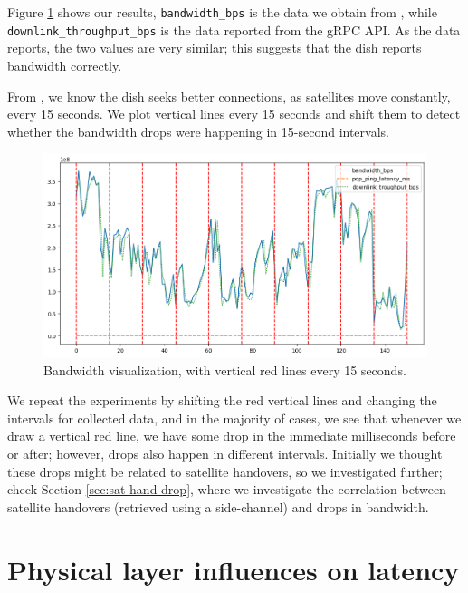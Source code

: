 \documentclass[]{report}
\begin{document}
Figure \ref{fig:vis-bw-15sec} shows our results, \texttt{bandwidth\_bps} is the data we obtain from
, while \texttt{downlink\_throughput\_bps} is the data reported
from the gRPC API. As the data reports, the two values are very similar; this suggests that the dish reports bandwidth
correctly.

From \cite{llc-application}, we know the dish seeks better connections, as satellites move constantly, every 15 seconds.
We plot vertical lines every 15 seconds and shift them to detect whether the bandwidth drops were happening in 15-second
intervals.

\begin{figure}
    \centering
    \includegraphics[width=1.0\columnwidth]{img/bw-15seconds.png}
    \caption{Bandwidth visualization, with vertical red lines every 15 seconds.}
    \label{fig:vis-bw-15sec}
\end{figure}

We repeat the experiments by shifting the red vertical lines and changing the intervals for collected data, and in the
majority of cases, we see that whenever we draw a vertical red line, we have some drop in the immediate milliseconds
before or after; however, drops also happen in different intervals. Initially we thought these drops might be related to
satellite handovers, so we investigated further; check Section \ref{sec:sat-hand-drop}, where we investigate the
correlation between satellite handovers (retrieved using a side-channel) and drops in bandwidth. 

\section{Physical layer influences on latency}
\end{document}
